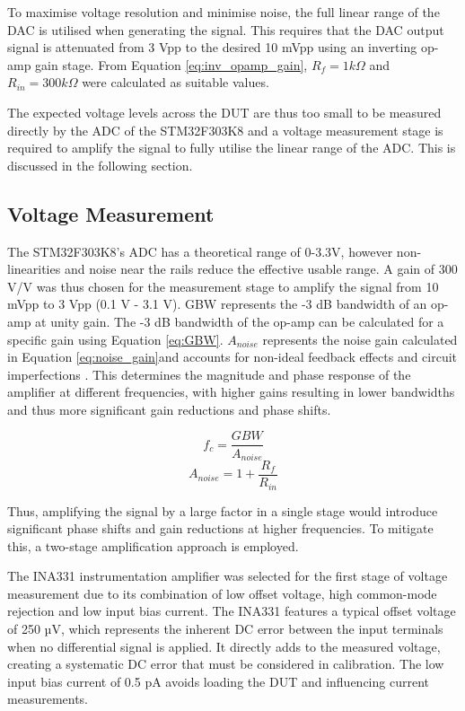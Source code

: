To maximise voltage resolution and minimise noise, the full linear range of the \ac{DAC} is utilised when generating the signal. This requires that the \ac{DAC} output signal is attenuated from 3 Vpp to the desired 10 mVpp using an inverting op-amp gain stage. From Equation \ref{eq:inv_opamp_gain}, $R_{f}=1 k\Omega$ and $R_{in}=300 k\Omega$ were calculated as suitable values.

The expected voltage levels across the \ac{DUT} are thus too small to be measured directly by the \ac{ADC} of the STM32F303K8 and a voltage measurement stage is required to amplify the signal to fully utilise the linear range of the \ac{ADC}. This is discussed in the following section.

\subsection{Voltage Measurement}
The STM32F303K8's \ac{ADC} has a theoretical range of 0-3.3V, however non-linearities and noise near the rails reduce the effective usable range. A gain of 300 V/V was thus chosen for the measurement stage to amplify the signal from 10 mVpp to 3 Vpp (0.1 V - 3.1 V). \Ac{GBW} represents the -3 dB bandwidth of an op-amp at unity gain. The -3 dB bandwidth of the op-amp can be calculated for a specific gain using Equation \ref{eq:GBW}. $A_{noise}$ represents the noise gain calculated in Equation \ref{eq:noise_gain}and accounts for non-ideal feedback effects and circuit imperfections \cite{fiore53GainBandwidthProduct2018}. This determines the magnitude and phase response of the amplifier at different frequencies, with higher gains resulting in lower bandwidths and thus more significant gain reductions and phase shifts.

\begin{equation}
    f_c = \frac{GBW}{A_{noise}}
    \label{eq:GBW}
\end{equation}
\begin{equation}
    A_{noise} = 1 + \frac{R_f}{R_{in}}
    \label{eq:noise_gain}
\end{equation}

Thus, amplifying the signal by a large factor in a single stage would introduce significant phase shifts and gain reductions at higher frequencies. To mitigate this, a two-stage amplification approach is employed.

The INA331 instrumentation amplifier was selected for the first stage of voltage measurement due to its combination of low offset voltage, high common-mode rejection and low input bias current. The INA331 features a typical offset voltage of 250 µV, which represents the inherent DC error between the input terminals when no differential signal is applied. It directly adds to the measured voltage, creating a systematic DC error that must be considered in calibration. The low input bias current of 0.5 pA avoids loading the \ac{DUT} and influencing current measurements. 

